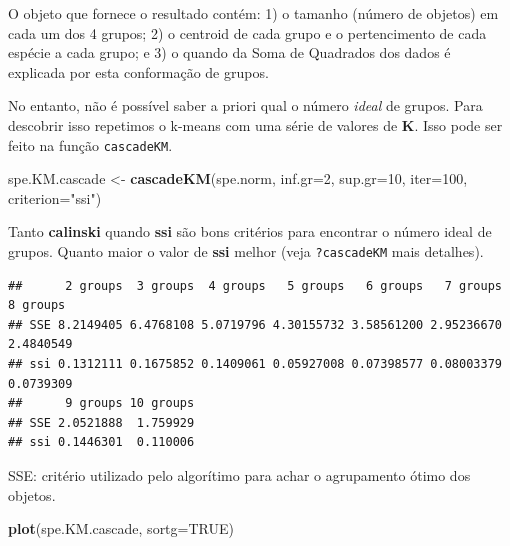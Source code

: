\documentclass[
]{book}
\newenvironment{Shaded}{\begin{snugshade}}{\end{snugshade}}
\newcommand{\CommentTok}[1]{\textcolor[rgb]{0.56,0.35,0.01}{\textit{#1}}}
\newcommand{\DataTypeTok}[1]{\textcolor[rgb]{0.13,0.29,0.53}{#1}}
\newcommand{\DecValTok}[1]{\textcolor[rgb]{0.00,0.00,0.81}{#1}}
\newcommand{\KeywordTok}[1]{\textcolor[rgb]{0.13,0.29,0.53}{\textbf{#1}}}
\newcommand{\NormalTok}[1]{#1}
\newcommand{\OperatorTok}[1]{\textcolor[rgb]{0.81,0.36,0.00}{\textbf{#1}}}
\newcommand{\OtherTok}[1]{\textcolor[rgb]{0.56,0.35,0.01}{#1}}
\newcommand{\StringTok}[1]{\textcolor[rgb]{0.31,0.60,0.02}{#1}}
\begin{document}
O objeto que fornece o resultado contém: 1) o tamanho (número de objetos) em cada um dos 4 grupos; 2) o centroid de cada grupo e o pertencimento de cada espécie a cada grupo; e 3) o quando da Soma de Quadrados dos dados é explicada por esta conformação de grupos.

No entanto, não é possível saber a priori qual o número \emph{ideal} de grupos. Para descobrir isso repetimos o k-means com uma série de valores de \textbf{K}. Isso pode ser feito na função \texttt{cascadeKM}.

\begin{Shaded}
\begin{Highlighting}[]
\NormalTok{spe.KM.cascade <-}\StringTok{ }\KeywordTok{cascadeKM}\NormalTok{(spe.norm, }\DataTypeTok{inf.gr=}\DecValTok{2}\NormalTok{, }\DataTypeTok{sup.gr=}\DecValTok{10}\NormalTok{, }\DataTypeTok{iter=}\DecValTok{100}\NormalTok{, }\DataTypeTok{criterion=}\StringTok{"ssi"}\NormalTok{) }
\end{Highlighting}
\end{Shaded}

Tanto \textbf{calinski} quando \textbf{ssi} são bons critérios para encontrar o número ideal de grupos. Quanto maior o valor de \textbf{ssi} melhor (veja \texttt{?cascadeKM} mais detalhes).

\begin{Shaded}
\end{Shaded}

\begin{verbatim}
##      2 groups  3 groups  4 groups   5 groups   6 groups   7 groups  8 groups
## SSE 8.2149405 6.4768108 5.0719796 4.30155732 3.58561200 2.95236670 2.4840549
## ssi 0.1312111 0.1675852 0.1409061 0.05927008 0.07398577 0.08003379 0.0739309
##      9 groups 10 groups
## SSE 2.0521888  1.759929
## ssi 0.1446301  0.110006
\end{verbatim}

SSE: critério utilizado pelo algorítimo para achar o agrupamento ótimo dos objetos.

\begin{Shaded}
\begin{Highlighting}[]
\KeywordTok{plot}\NormalTok{(spe.KM.cascade, }\DataTypeTok{sortg=}\OtherTok{TRUE}\NormalTok{)}
\end{Highlighting}
\end{Shaded}
\end{document}
